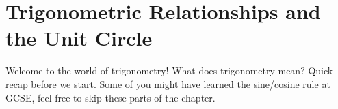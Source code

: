 \documentclass[../../main.tex]{subfiles}
\begin{document}
\chapter{Trigonometric Relationships and the Unit Circle}

Welcome to the world of trigonometry!
What does trigonometry mean?
Quick recap before we start. Some of you might have learned the sine/cosine rule at GCSE, feel free to skip these parts of the chapter.
\end{document}
